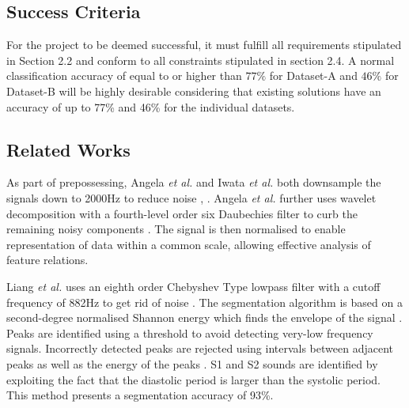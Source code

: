 \documentclass[10pt,twocolumn]{witseiepaper}
\newcommand{\RomanNumeralCaps}[1]
    {\MakeUppercase{\romannumeral #1}}
\begin{document}
\subsection{Success Criteria}

For the project to be deemed successful, it must fulfill all requirements stipulated in Section 2.2 and conform to all constraints stipulated in section 2.4. A normal classification accuracy of  equal to or higher than $77\%$ for Dataset-A and $46\%$ for Dataset-B will be highly desirable considering that existing solutions have an accuracy of up to 77\% and 46\% for the individual datasets.

\subsection{Related Works}

As part of prepossessing, Angela \textit{et al.} and Iwata \textit{et al.} both downsample the signals down to 2000Hz to reduce noise \cite{iwata1980algorithm}, \cite{26}. Angela \textit{et al.} further uses wavelet decomposition with a fourth-level order six Daubechies filter to curb the remaining noisy components \cite{26}. The signal is then normalised to enable representation of data within a common scale, allowing effective analysis of feature relations.

Liang \textit{et al.} uses an eighth order Chebyshev Type \RomanNumeralCaps{1} lowpass filter with a cutoff frequency of 882Hz to get rid of noise \cite{liang1997heart}. The segmentation algorithm is based on a second-degree normalised Shannon energy which finds the envelope of the signal \cite{liang1997heart}. Peaks are identified using a threshold to avoid detecting very-low frequency signals. Incorrectly detected peaks are rejected using intervals between adjacent peaks as well as the energy of the peaks \cite{liang1997heart}. S1 and S2 sounds are identified by exploiting the fact that the diastolic period is larger than the systolic period. This method presents a segmentation accuracy of 93\%.
\end{document}
